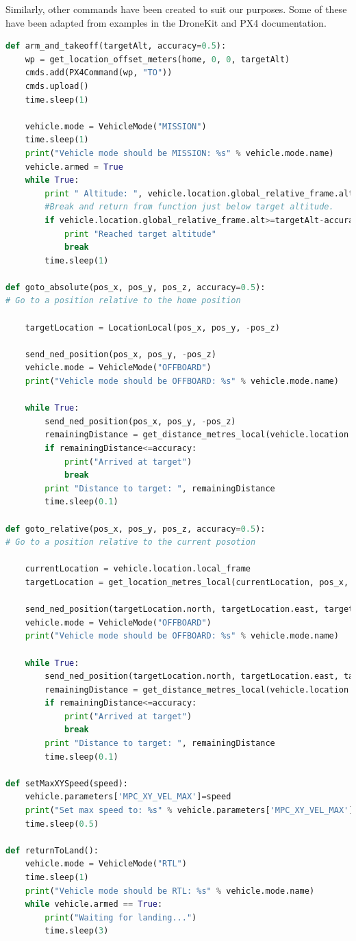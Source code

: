 \documentclass[11pt]{article}
\begin{document}
Similarly, other commands have been created to suit our purposes. Some of these have been adapted from examples in the DroneKit and PX4 documentation.\cite{dronekit}\cite{PX4_dev_guide}

\begin{lstlisting}[language=Python]
def arm_and_takeoff(targetAlt, accuracy=0.5):
    wp = get_location_offset_meters(home, 0, 0, targetAlt)
    cmds.add(PX4Command(wp, "TO"))
    cmds.upload()
    time.sleep(1)

    vehicle.mode = VehicleMode("MISSION")
    time.sleep(1)
    print("Vehicle mode should be MISSION: %s" % vehicle.mode.name)
    vehicle.armed = True
    while True:
        print " Altitude: ", vehicle.location.global_relative_frame.alt
        #Break and return from function just below target altitude.
        if vehicle.location.global_relative_frame.alt>=targetAlt-accuracy:
            print "Reached target altitude"
            break
        time.sleep(1)

def goto_absolute(pos_x, pos_y, pos_z, accuracy=0.5):
# Go to a position relative to the home position

    targetLocation = LocationLocal(pos_x, pos_y, -pos_z)

    send_ned_position(pos_x, pos_y, -pos_z)
    vehicle.mode = VehicleMode("OFFBOARD")
    print("Vehicle mode should be OFFBOARD: %s" % vehicle.mode.name)

    while True:
        send_ned_position(pos_x, pos_y, -pos_z)
        remainingDistance = get_distance_metres_local(vehicle.location.local_frame, targetLocation)
        if remainingDistance<=accuracy:
            print("Arrived at target")
            break
        print "Distance to target: ", remainingDistance
        time.sleep(0.1)

def goto_relative(pos_x, pos_y, pos_z, accuracy=0.5):
# Go to a position relative to the current posotion

    currentLocation = vehicle.location.local_frame
    targetLocation = get_location_metres_local(currentLocation, pos_x, pos_y, -pos_z)\

    send_ned_position(targetLocation.north, targetLocation.east, targetLocation.down)
    vehicle.mode = VehicleMode("OFFBOARD")
    print("Vehicle mode should be OFFBOARD: %s" % vehicle.mode.name)

    while True:
        send_ned_position(targetLocation.north, targetLocation.east, targetLocation.down)
        remainingDistance = get_distance_metres_local(vehicle.location.local_frame, targetLocation)
        if remainingDistance<=accuracy:
            print("Arrived at target")
            break
        print "Distance to target: ", remainingDistance
        time.sleep(0.1)

def setMaxXYSpeed(speed):
    vehicle.parameters['MPC_XY_VEL_MAX']=speed
    print("Set max speed to: %s" % vehicle.parameters['MPC_XY_VEL_MAX'])
    time.sleep(0.5)

def returnToLand():
    vehicle.mode = VehicleMode("RTL")
    time.sleep(1)
    print("Vehicle mode should be RTL: %s" % vehicle.mode.name)
    while vehicle.armed == True:
        print("Waiting for landing...")
        time.sleep(3)
\end{lstlisting}
\end{document}
